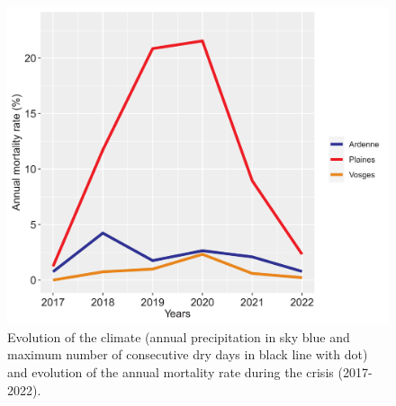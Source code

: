 \documentclass[3p,procedia]{elsarticle}
\begin{document}
\begin{figure}[htbp] 
   \centering
   \includegraphics[width=0.9 \textwidth]{Annual_evol_Ardennes_vosges_plaines.png}
    \caption{Evolution of the climate (annual precipitation in sky blue and  maximum number of consecutive dry days in black line with dot) and evolution of the annual mortality rate during the crisis (2017-2022).}
    \label{evol_gen}
\end{figure}

    
\end{document}
